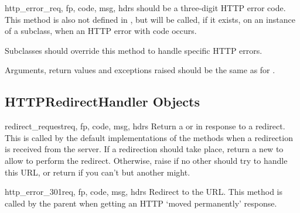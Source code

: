 \begin{methoddesc}[BaseHandler]{http_error_}{req, fp, code, msg, hdrs}
 should be a three-digit HTTP error code.  This method is
also not defined in , but will be called, if it
exists, on an instance of a subclass, when an HTTP error with code
 occurs.

Subclasses should override this method to handle specific HTTP
errors.

Arguments, return values and exceptions raised should be the same as
for .
\end{methoddesc}

\subsection{HTTPRedirectHandler Objects \label{http-redirect-handler}}


\begin{methoddesc}[HTTPRedirectHandler]{redirect_request}{req,
                                                  fp, code, msg, hdrs}
Return a  or  in response to a redirect.
This is called by the default implementations of the
 methods when a redirection is received from
the server.  If a redirection should take place, return a new
 to allow  to perform the
redirect.  Otherwise, raise  if no other
 should try to handle this URL, or return 
if you can't but another  might.


\end{methoddesc}


\begin{methoddesc}[HTTPRedirectHandler]{http_error_301}{req,
                                                  fp, code, msg, hdrs}
Redirect to the  URL.  This method is called by
the parent  when getting an HTTP
`moved permanently' response.
\end{methoddesc}

